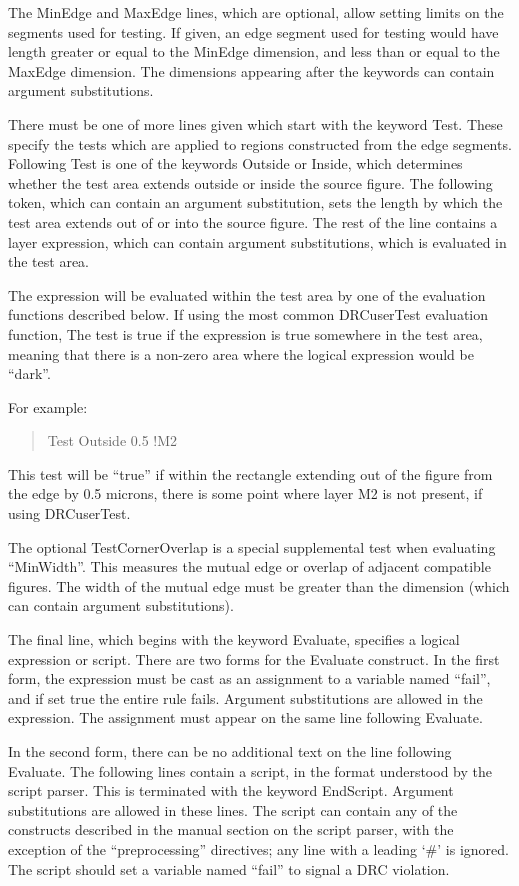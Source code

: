 The {\et MinEdge} and {\et MaxEdge} lines, which are optional, allow
setting limits on the segments used for testing.  If given, an edge
segment used for testing would have length greater or equal to the
{\et MinEdge} dimension, and less than or equal to the {\et MaxEdge}
dimension.  The dimensions appearing after the keywords can contain
argument substitutions.

There must be one of more lines given which start with the keyword
{\et Test}.  These specify the tests which are applied to regions
constructed from the edge segments.  Following {\et Test} is one of
the keywords {\et Outside} or {\et Inside}, which determines whether
the test area extends outside or inside the source figure.  The
following token, which can contain an argument substitution, sets the
length by which the test area extends out of or into the source
figure.  The rest of the line contains a layer expression, which can
contain argument substitutions, which is evaluated in the test area. 

The expression will be evaluated within the test area by one of the
evaluation functions described below.  If using the most common {\vt
DRCuserTest} evaluation function, The test is true if the expression
is true somewhere in the test area, meaning that there is a non-zero
area where the logical expression would be ``dark''.

For example:
\begin{quote}\vt
Test Outside 0.5 !M2
\end{quote}
This test will be ``true'' if within the rectangle extending out of
the figure from the edge by 0.5 microns, there is some point where
layer {\vt M2} is not present, if using {\vt DRCuserTest}.

The optional {\et TestCornerOverlap} is a special supplemental test
when evaluating ``{\vt MinWidth}''.  This measures the mutual edge or
overlap of adjacent compatible figures.  The width of the mutual edge
must be greater than the dimension (which can contain argument
substitutions).

The final line, which begins with the keyword {\et Evaluate},
specifies a logical expression or script.  There are two forms for the
{\et Evaluate} construct.  In the first form, the expression must be
cast as an assignment to a variable named ``{\vt fail}'', and if set
true the entire rule fails.  Argument substitutions are allowed in the
expression.  The assignment must appear on the same line following
{\et Evaluate}.

In the second form, there can be no additional text on the line
following {\et Evaluate}.  The following lines contain a script, in
the format understood by the script parser.  This is terminated with
the keyword {\et EndScript}.  Argument substitutions are allowed in
these lines.  The script can contain any of the constructs described
in the manual section on the script parser, with the exception of the
``preprocessing'' directives; any line with a leading `\#' is ignored. 
The script should set a variable named ``{\vt fail}'' to signal a DRC
violation.

